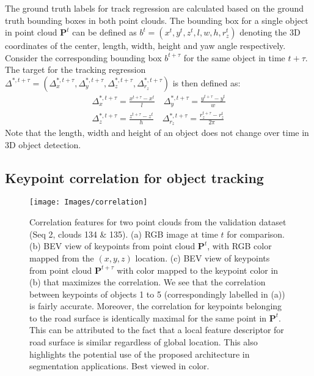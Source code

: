\documentclass[10pt,twocolumn,letterpaper]{article}
\begin{document}
The ground truth labels for track regression are calculated based on the ground truth bounding boxes in both point clouds. The bounding box for a single object in point cloud $\mathbf{P}^t$ can be defined as $b^t = (x^t, y^t, z^t, l, w, h, r_z^t)$ denoting the 3D coordinates of the center, length, width, height and yaw angle respectively. Consider the corresponding bounding box $b^{t+\tau}$ for the same object in time $t+\tau$. The target for the tracking regression $\Delta^{*,t+\tau} = (\Delta_{x}^{*,t+\tau}, \Delta_{y}^{*,t+\tau}, \Delta_{z}^{*,t+\tau}, \Delta_{r_z}^{*,t+\tau})$ is then defined as:
\begin{align}
   \label{eq:tracking_gt}
   \Delta_{x}^{*,t+\tau} = \frac{x^{t+\tau} - x^t}{l} \quad \Delta_{y}^{*,t+\tau} = \frac{y^{t+\tau} - y^t}{w}\\
   \Delta_{z}^{*,t+\tau} = \frac{z^{t+\tau} - z^t}{h} \quad \Delta_{r_z}^{*,t+\tau} = \frac{r_z^{t+\tau} - r_z^t}{2\pi}
\end{align}
Note that the length, width and height of an object does not change over time in 3D object detection.

\subsection{Keypoint correlation for object tracking}\label{sec:method:keypoint_corr}
\begin{figure*}
   \begin{center}
   \texttt{[image: Images/correlation]}
\end{center}
      \caption{Correlation features for two point clouds from the validation dataset (Seq 2, clouds 134 \& 135). (a) RGB image at time $t$ for comparison. (b) BEV view of keypoints from point cloud $\mathbf{P}^t$, with RGB color mapped from the $(x,y,z)$ location. (c) BEV view of keypoints from point cloud $\mathbf{P}^{t+\tau}$ with color mapped to the keypoint color in (b) that maximizes the correlation. We see that the correlation between keypoints of objects 1 to 5 (correspondingly labelled in (a)) is fairly accurate. Moreover, the correlation for keypoints belonging to the road surface is identically maximal for the same point in $\mathbf{P}^t$. This can be attributed to the fact that a local feature descriptor for road surface is similar regardless of global location. This also highlights the potential use of the proposed architecture in segmentation applications. Best viewed in color.}
   \label{fig:correlation}
\end{figure*}
\end{document}
